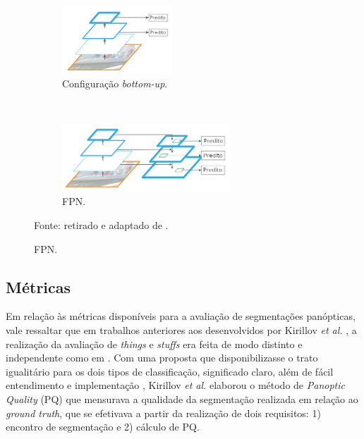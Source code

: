 \begin{figure}[H]
   \caption{Extrações de características e FPN.}
   \centering
   \label{panoptic:fig:2}
    \begin{subfigure}[t]{0.45\textwidth}
        \centering
        \includegraphics[height=1in]{recursos/imagens/panoptic/bottom-up.png}
        \caption{Configuração \textit{bottom-up}.}
        \label{panoptic:fig:2.1}
    \end{subfigure}%
    ~ 
    \begin{subfigure}[t]{0.45\textwidth}
        \centering
        \includegraphics[height=1in]{recursos/imagens/panoptic/FPN.png}
        \caption{FPN.}
        \label{panoptic:fig:2.2}
    \end{subfigure}%

    \vspace*{1 cm}
    Fonte: retirado e adaptado de \cite{Lin2016}.
\end{figure}


\subsection{Métricas}
\label{panoptic:metrics}
Em relação às métricas disponíveis para a avaliação de segmentações panópticas, vale ressaltar que em trabalhos anteriores aos desenvolvidos por Kirillov \textit{et al.} \cite{Kirillov2019a}, a realização da avaliação de \textit{things} e \textit{stuffs} era feita de modo distinto e independente como em \cite{Sun2014, Yao2012}. Com uma proposta que disponibilizasse o trato igualitário para os dois tipos de classificação, significado claro, além de fácil entendimento e implementação , Kirillov \textit{et al.} \cite{Kirillov2019a} elaborou o método de \textit{Panoptic Quality} (PQ) que mensurava a qualidade da segmentação realizada em relação ao \textit{ground truth}, que se efetivava  a partir da realização de dois requisitos: 1) encontro de segmentação e  2) cálculo de PQ.

